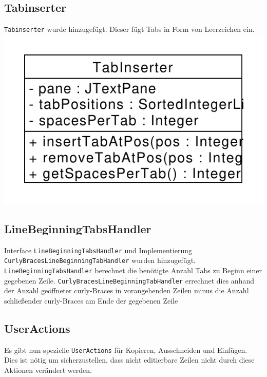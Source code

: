 \documentclass[a4paper]{scrreprt}
\begin{document}
\subsection{Tabinserter}
\verb!Tabinserter! wurde hinzugefügt. Dieser fügt Tabs in Form von Leerzeichen ein.\\
\includegraphics[scale=0.5]{TabInserter.pdf}\\
\subsection{LineBeginningTabsHandler}
Interface \verb!LineBeginningTabsHandler! und Implementierung \\ \verb!CurlyBracesLineBeginningTabHandler! wurden hinzugefügt.\\ \verb!LineBeginningTabsHandler! berechnet die benötigte Anzahl Tabs zu Beginn einer gegebenen Zeile. \verb!CurlyBracesLineBeginningTabHandler! errechnet dies anhand der Anzahl geöffneter curly-Braces in vorangehenden Zeilen minus die Anzahl schließender curly-Braces am Ende der gegebenen Zeile\\
\subsection{UserActions}
Es gibt nun spezielle \verb!UserActions! für Kopieren, Ausschneiden und Einfügen. Dies ist nötig um sicherzustellen, dass nicht editierbare Zeilen nicht durch diese Aktionen verändert werden.\\
\end{document}
